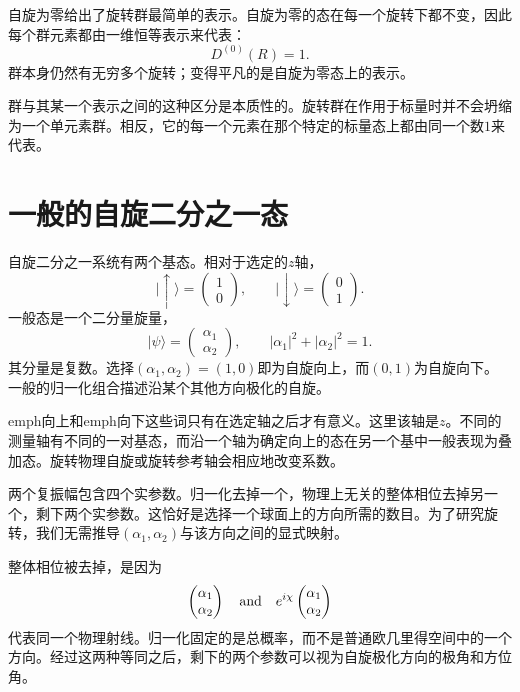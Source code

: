 自旋为零给出了旋转群最简单的表示。自旋为零的态在每一个旋转下都不变，因此每个群元素都由一维恒等表示来代表：
\begin{equation}
D^{(0)}(R)=1.
\end{equation}
群本身仍然有无穷多个旋转；变得平凡的是自旋为零态上的表示。

群与其某一个表示之间的这种区分是本质性的。旋转群在作用于标量时并不会坍缩为一个单元素群。相反，它的每一个元素在那个特定的标量态上都由同一个数\(1\)来代表。

\section{一般的自旋二分之一态}

自旋二分之一系统有两个基态。相对于选定的\(z\)轴，
\begin{equation}
\lvert\uparrow\rangle=
\begin{pmatrix}1\\0\end{pmatrix},
\qquad
\lvert\downarrow\rangle=
\begin{pmatrix}0\\1\end{pmatrix}.
\end{equation}
一般态是一个二分量旋量，
\begin{equation}
\lvert\psi\rangle=
\begin{pmatrix}\alpha_1\\\alpha_2\end{pmatrix},
\qquad
|\alpha_1|^2+|\alpha_2|^2=1.
\label{eq:l3-spinor}
\end{equation}
其分量是复数。选择\((\alpha_1,\alpha_2)=(1,0)\)即为自旋向上，而\((0,1)\)为自旋向下。一般的归一化组合描述沿某个其他方向极化的自旋。

emph{向上}和emph{向下}这些词只有在选定轴之后才有意义。这里该轴是\(z\)。不同的测量轴有不同的一对基态，而沿一个轴为确定向上的态在另一个基中一般表现为叠加态。旋转物理自旋或旋转参考轴会相应地改变系数。

两个复振幅包含四个实参数。归一化去掉一个，物理上无关的整体相位去掉另一个，剩下两个实参数。这恰好是选择一个球面上的方向所需的数目。为了研究旋转，我们无需推导\((\alpha_1,\alpha_2)\)与该方向之间的显式映射。

整体相位被去掉，是因为
\begin{equation}
\begin{pmatrix}\alpha_1\\\alpha_2\end{pmatrix}
\quad\hbox{and}\quad
e^{i\chi}
\begin{pmatrix}\alpha_1\\\alpha_2\end{pmatrix}
\end{equation}
代表同一个物理射线。归一化固定的是总概率，而不是普通欧几里得空间中的一个方向。经过这两种等同之后，剩下的两个参数可以视为自旋极化方向的极角和方位角。

